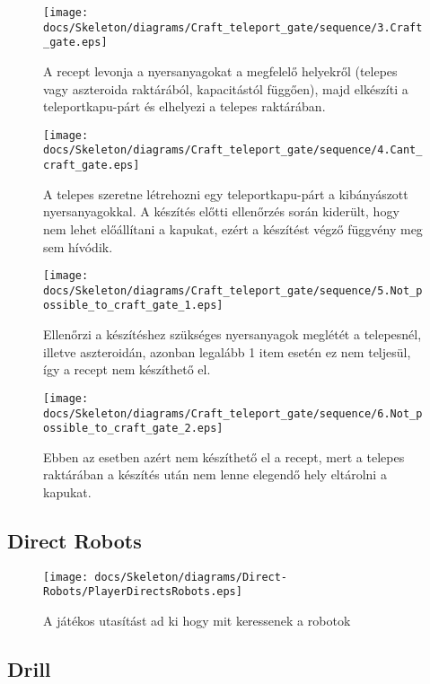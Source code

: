 \begin{figure}[H] 
    \centering 
    \texttt{[image: docs/Skeleton/diagrams/Craft\_teleport\_gate/sequence/3.Craft\_gate.eps]} 
    \caption{A recept levonja a nyersanyagokat a megfelelő helyekről (telepes vagy aszteroida raktárából, kapacitástól függően),  majd elkészíti a teleportkapu-párt és elhelyezi a telepes raktárában.  } 
\end{figure}

\begin{figure}[H] 
    \centering 
    \texttt{[image: docs/Skeleton/diagrams/Craft\_teleport\_gate/sequence/4.Cant\_craft\_gate.eps]} 
    \caption{ A telepes szeretne létrehozni egy teleportkapu-párt a kibányászott nyersanyagokkal.  A készítés előtti ellenőrzés során kiderült, hogy nem lehet előállítani a kapukat, ezért a készítést végző függvény meg sem hívódik. } 
\end{figure}

\begin{figure}[H] 
    \centering 
    \texttt{[image: docs/Skeleton/diagrams/Craft\_teleport\_gate/sequence/5.Not\_possible\_to\_craft\_gate\_1.eps]} 
    \caption{Ellenőrzi a készítéshez szükséges nyersanyagok meglétét a telepesnél, illetve aszteroidán,  azonban legalább 1 item esetén ez nem teljesül, így a recept nem készíthető el.  } 
\end{figure}

\begin{figure}[H] 
    \centering 
    \texttt{[image: docs/Skeleton/diagrams/Craft\_teleport\_gate/sequence/6.Not\_possible\_to\_craft\_gate\_2.eps]} 
    \caption{Ebben az esetben azért nem készíthető el a recept, mert a telepes raktárában  a készítés után nem lenne elegendő hely eltárolni a kapukat. } 
\end{figure}

\subsection{Direct Robots}

\begin{figure}[H] 
    \centering 
    \texttt{[image: docs/Skeleton/diagrams/Direct-Robots/PlayerDirectsRobots.eps]} 
    \caption{A játékos utasítást ad ki hogy mit keressenek a robotok} 
\end{figure}

\subsection{Drill}

